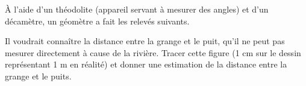 \documentclass[exercice]{thedocument}%
\begin{document}
%
À l'aide d'un théodolite (appareil servant à mesurer des angles) et d'un
décamètre, un géomètre a fait les relevés suivants.
\begingroup\centering{}\par\endgroup
Il voudrait connaître la distance entre la grange et le puit, qu'il ne peut pas
mesurer directement à cause de la rivière.
\vskip10pt
Tracer cette figure (1 cm sur le dessin représentant 1 m en réalité) et
donner une estimation de la distance entre la grange et le puits.
\end{document}
